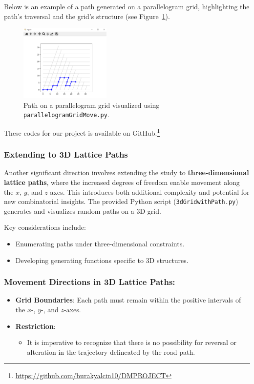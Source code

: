\documentclass{article}
\begin{document}
Below is an example of a path generated on a parallelogram grid, highlighting the path's traversal and the grid's structure (see Figure~\ref{fig:parallelogram-path}).

\begin{figure}[H]
    \centering
    \includegraphics[width=0.4\textwidth]{images/parallelogram.png}
    \caption{Path on a parallelogram grid visualized using \texttt{parallelogramGridMove.py}.}
    \label{fig:parallelogram-path}
\end{figure}
These codes for our project is available on GitHub.\footnote{\url{https://github.com/burakyalcin10/DMPROJECT}}


\subsubsection{Extending to 3D Lattice Paths}
Another significant direction involves extending the study to \textbf{three-dimensional lattice paths}, where the increased degrees of freedom enable movement along the $x$, $y$, and $z$ axes. This introduces both additional complexity and potential for new combinatorial insights. The provided Python script (\texttt{3dGridwithPath.py}) generates and visualizes random paths on a 3D grid.

Key considerations include:
\begin{itemize}
    \item Enumerating paths under three-dimensional constraints.
    \item Developing generating functions specific to 3D structures.
\end{itemize}

\subsubsection{Movement Directions in 3D Lattice Paths:}

\begin{itemize}
    \item \textbf{Grid Boundaries}: Each path must remain within the positive intervals of the \(x\)-, \(y\)-, and \(z\)-axes.
    \item \textbf{Restriction}:
    \begin{itemize}
        \item It is imperative to recognize that there is no possibility for reversal or alteration in the trajectory delineated by the road path.
    \end{itemize}
\end{itemize}
\end{document}
